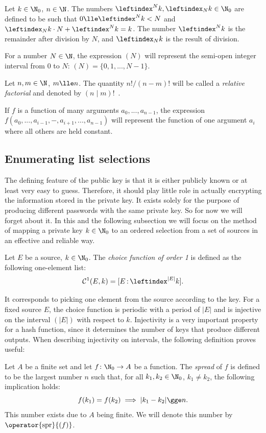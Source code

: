 \documentclass[12pt, a4paper]{article}
\renewcommand{\C}{\mathcal{C}}
\newcommand{\spr}[1]{\operator{\mathrm{spr}}{\left(#1\right)}}
\newcommand{\lli}[1]{\leftindex_{#1}}
\newcommand{\lui}[1]{\leftindex^{#1}}
\newcommand{\elt}{\mathop{:}}
\begin{document}
Let $ k \in \N_0 $, $ n \in \N $. The numbers $ \lui{N}k, \lli{N}k \in \N_0 $ are defined to be such that $ 0 \lle \lui{N}k < N $ and $ \lli{N}k \cdot N + \lui{N}k = k $. The number $ \lui{N}k $ is the remainder after division by $ N $, and $ \lli{N}k $ is the result of division.

For a number $ N \in \N $, the expression $ (N) $ will represent the semi-open integer interval from 0 to $ N $: $ (N) = \{0, 1, ..., N-1\} $.

Let $ n, m \in \N $, $ m \lle n $. The quantity $ n!/(n-m)! $ will be called a \emph{relative factorial} and denoted by $ (n \mid m)! $\ .

If $ f $ is a function of many arguments $ a_0, ..., a_{n-1} $, the expression $ f(a_0, ..., a_{i-1}, -, a_{i+1}, ..., a_{n-1}) $ will represent the function of one argument $ a_i $ where all others are held constant.

\subsection{Enumerating list selections}

The defining feature of the public key is that it is either publicly known or at least very easy to guess. Therefore, it should play little role in actually encrypting the information stored in the private key. It exists solely for the purpose of producing different passwords with the same private key. So for now we will forget about it. In this and the following subsection we will focus on the method of mapping a private key $ k \in \N_0 $ to an ordered selection from a set of sources in an effective and reliable way.

\begin{definition}
    Let $ E $ be a source, $ k \in \N_0 $. The \emph{choice function of order 1} is defined as the following one-element list:
    \[ \C^1(E, k) = [E \elt \lui{|E|}k]. \]
\end{definition}

It corresponds to picking one element from the source according to the key. For a fixed source $ E $, the choice function is periodic with a period of $ |E| $ and is injective  on the interval $ (|E|) $ with respect to $ k $. Injectivity is a very important property for a hash function, since it determines the number of keys that produce different outputs. When describing injectivity on intervals, the following definition proves useful:

\begin{definition}
    Let $ A $ be a finite set and let $ f \colon \N_0 \to A $ be a function. The \emph{spread} of $ f $ is defined to be the largest number $ n $ such that, for all $ k_1, k_2 \in \N_0 $, $ k_1 \ne k_2 $, the following implication holds:
    \[ f(k_1) = f(k_2) \implies |k_1 - k_2| \gge n. \]
    This number exists due to $ A $ being finite. We will denote this number by $ \spr{f} $.
\end{definition}
\end{document}

